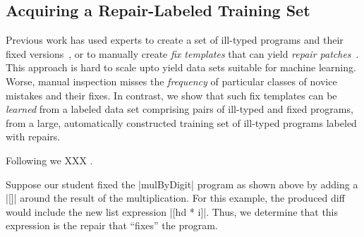 \subsection{Acquiring a Repair-Labeled Training Set}
\label{sec:overview:data}

Previous work has used experts to create a set of ill-typed programs 
and their fixed versions~\citep[][]{Lerner2007-dt, Loncaric2016-uk},
or to manually create \emph{fix templates} that can yield 
\emph{repair patches}~\citep[][]{martinez2013automatically,martinez2015mining}.
%
This approach is hard to scale upto yield data sets suitable for 
machine learning. Worse, manual inspection misses the \emph{frequency} 
of particular classes of novice mistakes and their fixes.
%
In contrast, we show that such fix templates can be 
\emph{learned} from a labeled data set comprising pairs 
of ill-typed and fixed programs, from a large, automatically 
constructed training set of ill-typed programs labeled with repairs.


%
Following \citep{Seidel:2017} we XXX .
%

 Suppose our student fixed the |mulByDigit| program as shown
above by adding a |[]| around the result of the multiplication. For this
example, the produced diff would include the new list expression |[hd * i]|.
Thus, we determine that this expression is the repair that ``fixes'' the program.


